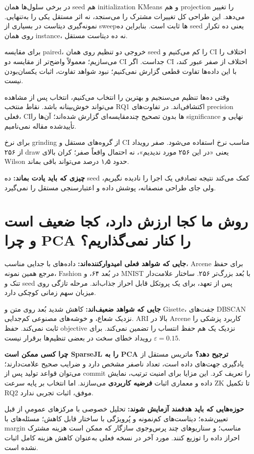 \documentclass[11pt,a4paper]{article}
\newcommand{\lesson}[1]{\clearpage\section{#1}}
\newcommand{\takeaway}[1]{\par\textbf{چیزی که باید یادت بماند:} #1\par}
\begin{document}
در برخی سلول‌ها همان seed هم initialization KMeans و هم projection را تغییر می‌دهد. این طراحی کل تغییرات مشترک را می‌سنجد، نه اثر مستقل یکی را به‌تنهایی. نمونه‌گیری دیتاست در بسیاری از sweepها ثابت است. بنابراین ده seed یعنی ده تکرار روی همان instance، نه ده دیتاست مستقل.

برای مقایسه paired، خروجی دو تنظیم روی همان seed را کم می‌کنیم و CI اختلاف را می‌سازیم؛ معمولاً واضح‌تر از مقایسه دو CI جداست. اگر CI اختلاف از صفر عبور کند، با این داده‌ها تفاوت قطعی گزارش نمی‌کنیم؛ نبود شواهد تفاوت، اثبات یکسان‌بودن نیست.

وقتی ده‌ها تنظیم می‌سنجیم و بهترین را انتخاب می‌کنیم، انتخاب پس از مشاهده می‌تواند خوش‌بینانه باشد. نقاط منتخب RQ1 اکتشافی‌اند. در تفاوت‌های precision فعلی، CIها بدون تصحیح چندمقایسه‌ای گزارش شده‌اند؛ آن‌ها را significance نهایی و تأییدشده مقاله نمی‌نامیم.

برای نرخ grinding از گروه‌های مستقل و CI مناسب نرخ استفاده می‌شود. صفر رویداد از ۲۵۶ draw یعنی «در این ۲۵۶ مورد ندیدیم»، نه احتمال واقعاً صفر؛ کران بالای Wilson حدود ۱٫۵ درصد می‌تواند باقی بماند.

\takeaway{ده seed کمک می‌کند نتیجه تصادفی یک اجرا را نادیده نگیریم، ولی جای طراحی منصفانه، پوشش داده و اعتبارسنجی مستقل را نمی‌گیرد.}

\lesson{روش ما کجا ارزش دارد، کجا ضعیف است و چرا PCA را کنار نمی‌گذاریم؟}
\textbf{جایی که شواهد فعلی امیدوارکننده‌اند:} داده‌های با جدایی مناسب، Arcene برای حفظ مرجع همین نمونه، Fashion در بُعد ۶۴، و MNIST با بُعد بزرگ‌تر ۲۵۶. ساختار علامت‌دار تنک و seed پس از تعهد، برای یک پروتکل قابل احراز جذاب‌اند. مرحله تازگی روی میزبان سهم زمانی کوچکی دارد.

\textbf{جایی که شواهد ضعیف‌اند:} کاهش شدید بُعد روی متن و Gisette، جفت‌های DBSCAN نزدیک شعاع، و خوشه‌های مصنوعی کم‌جدایی. ARI بالا در Arcene کاربرد پزشکی را ثابت نمی‌کند. حفظ objective نزدیک یک هم حفظ انتساب را تضمین نمی‌کند. برای \(\varepsilon=0.15\) رویداد خطای سخت در بعضی تنظیم‌ها برقرار نیست.

\textbf{چرا کسی ممکن است SparseJL را به PCA ترجیح دهد؟} ماتریس مستقل از یادگیری جهت‌های داده است، تعداد ناصفر مشخص دارد و ضرایب صحیح علامت‌دارند؛ می‌توان قواعد تولید پس از commit را تعریف کرد. این مزایا برای امنیت ترتیب، نمایش داده و معماری اثبات \textbf{فرضیه کاربردی} می‌سازند. اما انتخاب بر پایه سرعت ZK تا تکمیل RQ2 موفق، اثبات تجربی ندارد.

\textbf{حوزه‌هایی که باید هدفمند آزمایش شوند:} تحلیل خصوصی با مرکزهای عمومیِ از قبل تعیین‌شده؛ دیتاست‌های کم‌نمونه و پُرویژگی با ساختار قابل کاهش؛ مسئله‌های با margin مناسب؛ و سناریوهای چند پرس‌وجوی سازگار که ممکن است هزینه مشترک احراز داده را توزیع کنند. مورد آخر در نسخه فعلی به‌عنوان کاهش هزینه کامل اثبات نشده است.
\end{document}
